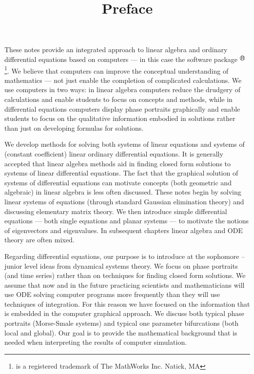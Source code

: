 \documentclass{ximera}
\title{Preface}
\begin{document}
\begin{abstract}
\end{abstract}
\maketitle


These notes provide an integrated approach to linear algebra and ordinary 
differential equations based on computers --- in this case the software 
package \Matlabp$^{R\!\!\!\!\!\bigcirc}$ \footnote{\Matlab is a registered trademark
of The MathWorks Inc. Natick, MA}.   We believe that computers can improve 
the conceptual understanding of mathematics --- not just enable the 
completion of complicated calculations.  We use computers in two ways:  in 
linear algebra computers reduce the drudgery of calculations and 
enable students to focus on concepts and methods, while in differential 
equations computers display phase portraits graphically and enable 
students to focus on the qualitative information embodied in solutions 
rather than just on developing formulas for solutions.

We develop methods for solving both systems of linear 
equations and systems of (constant coefficient) linear ordinary 
differential equations.  It is generally accepted that linear algebra 
methods aid in finding closed form solutions to systems of linear 
differential equations.  The fact that the graphical solution of systems 
of differential equations can motivate concepts (both geometric and algebraic)
in linear algebra is less often discussed.  These notes begin by solving linear 
systems of equations (through standard Gaussian elimination theory) and 
discussing elementary matrix theory.  We then introduce simple differential 
equations --- both single equations and planar systems --- to motivate the 
notions of eigenvectors and eigenvalues. In subsequent chapters linear algebra 
and ODE theory are often mixed.  

Regarding differential equations, our purpose is to introduce at the 
sophomore -- junior level ideas from dynamical systems theory.  We focus on 
phase portraits (and time series) rather than on techniques for finding
closed form solutions.  We assume that now and in the future practicing
scientists and mathematicians will use ODE solving computer programs
more frequently than they will use techniques of integration.  For this
reason we have focused on the information that is embedded in the computer  
graphical approach.  We discuss both typical phase portraits
(Morse-Smale systems) and typical one parameter bifurcations (both local 
and global).   Our goal is to provide the mathematical background that is
needed when interpreting the results of computer simulation.
\end{document}
